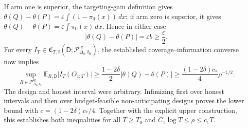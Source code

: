 If arm one is superior, the targeting-gain definition gives
\(\theta(Q)-\theta(P)=\varepsilon
\int(1-\pi_0(x))\,dx\); if arm zero is superior, it gives
\(\theta(Q)-\theta(P)=\varepsilon\int\pi_0(x)\,dx\).  Hence in either case
\[
 |\theta(Q)-\theta(P)|=\varepsilon b\geq\frac\varepsilon2.
\]
For every
\(I_T\in\mathfrak C_{T,\delta}(\mathsf D;
\mathcal P_{\Delta_0,b_0}^{\mathrm{fg}})\), the established
coverage--information converse now implies
\[
 \sup_{R\in\mathcal P_{\Delta_0,b_0}^{\mathrm{fg}}}
 \mathbb E_{R,\mathsf D}|I_T(O_{1:T})|
 \geq
 \frac{1-2\delta}{2}|\theta(Q)-\theta(P)|
 \geq\frac{(1-2\delta)c_*}{4}\rho^{-1/2}.
\]
The design and honest interval were arbitrary.  Infimizing first over honest
intervals and then over budget-feasible non-anticipating designs proves the
lower bound with \(c=(1-2\delta)c_*/4\).  Together with the explicit upper
construction, this establishes both inequalities for all \(T\geq T_0\) and
\(C_1\log T\leq\rho\leq c_1T\).
